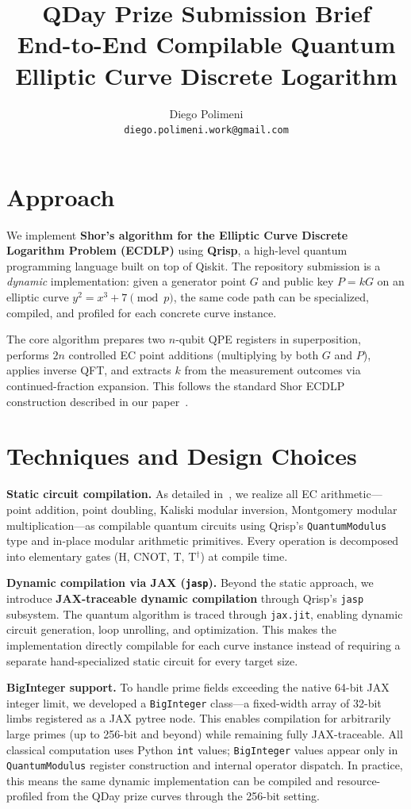 \documentclass[11pt,a4paper]{article}
\title{\vspace{-2em}\textbf{QDay Prize Submission Brief}\\[0.3em]
\large End-to-End Compilable Quantum Elliptic Curve Discrete Logarithm}
\author{Diego Polimeni\\\small\texttt{diego.polimeni.work@gmail.com}}
\date{}
\begin{document}
\maketitle
\vspace{-1.5em}

\section*{Approach}

We implement \textbf{Shor's algorithm for the Elliptic Curve Discrete Logarithm Problem (ECDLP)} using \textbf{Qrisp}, a high-level quantum programming language built on top of Qiskit. The repository submission is a \emph{dynamic} implementation: given a generator point $G$ and public key $P = kG$ on an elliptic curve $y^2 = x^3 + 7 \pmod{p}$, the same code path can be specialized, compiled, and profiled for each concrete curve instance.

The core algorithm prepares two $n$-qubit QPE registers in superposition, performs $2n$ controlled EC point additions (multiplying by both $G$ and $P$), applies inverse QFT, and extracts $k$ from the measurement outcomes via continued-fraction expansion. This follows the standard Shor ECDLP construction described in our paper~\cite{polimeni2025}.

\section*{Techniques and Design Choices}

\textbf{Static circuit compilation.}  
As detailed in~\cite{polimeni2025}, we realize all EC arithmetic---point addition, point doubling, Kaliski modular inversion, Montgomery modular multiplication---as compilable quantum circuits using Qrisp's \texttt{QuantumModulus} type and in-place modular arithmetic primitives. Every operation is decomposed into elementary gates (H, CNOT, T, T$^\dagger$) at compile time.

\textbf{Dynamic compilation via JAX (\texttt{jasp}).}  
Beyond the static approach, we introduce \textbf{JAX-traceable dynamic compilation} through Qrisp's \texttt{jasp} subsystem. The quantum algorithm is traced through \texttt{jax.jit}, enabling dynamic circuit generation, loop unrolling, and optimization. This makes the implementation directly compilable for each curve instance instead of requiring a separate hand-specialized static circuit for every target size.

\textbf{BigInteger support.}  
To handle prime fields exceeding the native 64-bit JAX integer limit, we developed a \texttt{BigInteger} class---a fixed-width array of 32-bit limbs registered as a JAX pytree node. This enables compilation for arbitrarily large primes (up to 256-bit and beyond) while remaining fully JAX-traceable. All classical computation uses Python \texttt{int} values; \texttt{BigInteger} values appear only in \texttt{QuantumModulus} register construction and internal operator dispatch. In practice, this means the same dynamic implementation can be compiled and resource-profiled from the QDay prize curves through the 256-bit setting.
\end{document}
